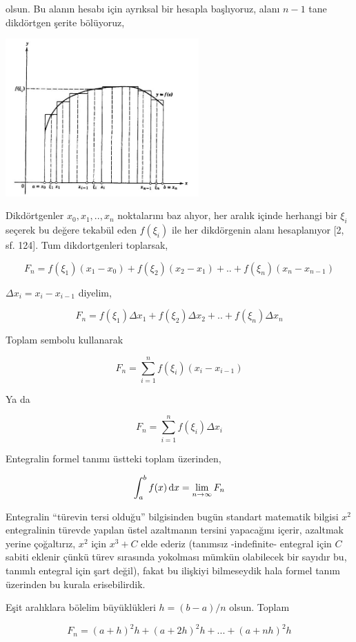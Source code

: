 \documentclass[12pt,fleqn]{article}\usepackage{../../common}
\begin{document}
olsun. Bu alanın hesabı için ayrıksal bir hesapla başlıyoruz, alanı $n-1$ tane
dikdörtgen şerite bölüyoruz,

\includegraphics[width=20em]{ode_mattuck_65_diffint1_04.jpg}

Dikdörtgenler $x_0,x_1,..,x_n$ noktalarını baz alıyor, her aralık içinde
herhangi bir $\xi_i$ seçerek bu değere tekabül eden $f(\xi_i)$ ile her
dikdörgenin alanı hesaplanıyor [2, sf. 124]. Tum dikdortgenleri toplarsak,

$$
F_n = f(\xi_1)(x_1 - x_0) + f(\xi_2)(x_2 - x_1) + .. + f(\xi_n)(x_n - x_{n-1})
$$

$\Delta x_i = x_i - x_{i-1}$ diyelim, 

$$
F_n = f(\xi_1)\Delta x_1 + f(\xi_2)\Delta x_2 + .. + f(\xi_n)\Delta x_n
$$

Toplam sembolu kullanarak

$$
F_n = \sum _{i=1}^{n} f(\xi_i) (x_i - x_{i-1}) 
$$

Ya da

$$
F_n = \sum _{i=1}^{n} f(\xi_i) \Delta x_i
$$

Entegralin formel tanımı üstteki toplam üzerinden,

$$
\int _{a}^{b} f(x) \,\mathrm{d} x = \lim_{n \to \infty} F_n
$$

Entegralin ``türevin tersi olduğu'' bilgisinden bugün standart matematik bilgisi
$x^2$ entegralinin türevde yapılan üstel azaltmanın tersini yapacağını içerir,
azaltmak yerine çoğaltırız, $x^2$ için $x^3 + C$ elde ederiz (tanımsız
-indefinite- entegral için $C$ sabiti eklenir çünkü türev sırasında yokolması
mümkün olabilecek bir sayıdır bu, tanımlı entegral için şart değil), fakat
bu ilişkiyi bilmeseydik hala formel tanım üzerinden bu kurala erisebilirdik. 

Eşit aralıklara bölelim büyüklükleri $h = (b-a)/n$ olsun. Toplam

$$
F_n = (a+h)^2 h + (a+2h)^2 h + ... + (a+nh)^2 h
$$
\end{document}
